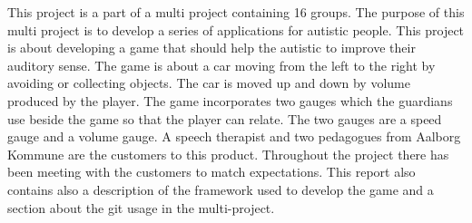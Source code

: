 This project is a part of a multi project containing 16 groups.
The purpose of this multi project is to develop a series of applications for autistic people.
This project is about developing a game that should help the autistic to improve their auditory sense.
The game is about a car moving from the left to the right by avoiding or collecting objects.
The car is moved up and down by volume produced by the player.
The game incorporates two gauges which the guardians use beside the game so that the player can relate.
The two gauges are a speed gauge and a volume gauge.
A speech therapist and two pedagogues from Aalborg Kommune are the customers to this product.
Throughout the project there has been meeting with the customers to match expectations.
This report also contains also a description of the framework used to develop the game and a section about the git usage in the multi-project.
